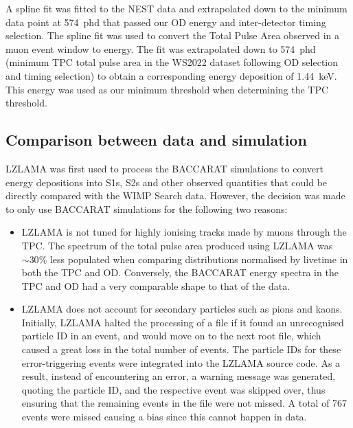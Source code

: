 A spline fit was fitted to the NEST data and extrapolated down to the minimum data point at 574~phd that passed our OD energy and inter-detector timing selection. The spline fit was used to convert the Total Pulse Area observed in a muon event window to energy. The fit was extrapolated down to 574~phd (minimum TPC total pulse area in the WS2022 dataset following OD selection and timing selection) to obtain a corresponding energy deposition of 1.44~keV. This energy was used as our minimum threshold when determining the TPC threshold.

\subsection{Comparison between data and simulation}\label{sec:Muons/MuonFluxDataSimComp}
LZLAMA was first used to process the BACCARAT simulations to convert energy depositions into S1s, S2s and other observed quantities that could be directly compared with the WIMP Search data. However, the decision was made to only use BACCARAT simulations for the following two reasons:
\begin{itemize}
    \item LZLAMA is not tuned for highly ionising tracks made by muons through the TPC. The spectrum of the total pulse area produced using LZLAMA was $\sim30\%$ less populated when comparing distributions normalised by livetime in both the TPC and OD. Conversely, the BACCARAT energy spectra in the TPC and OD had a very comparable shape to that of the data.
    \item LZLAMA does not account for secondary particles such as pions and kaons. Initially, LZLAMA halted the processing of a file if it found an unrecognised particle ID in an event, and would move on to the next root file, which caused a great loss in the total number of events. The particle IDs for these error-triggering events were integrated into the LZLAMA source code. As a result, instead of encountering an error, a warning message was generated, quoting the particle ID, and the respective event was skipped over, thus ensuring that the remaining events in the file were not missed. A total of 767 events were missed causing a bias since this cannot happen in data. 
\end{itemize}
